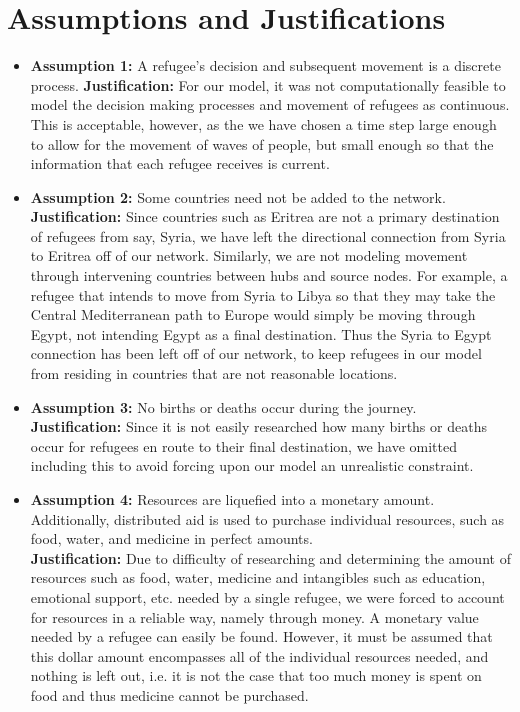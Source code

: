\documentclass{article}
\begin{document}
\section{Assumptions and Justifications}
\begin{itemize}

\item \textbf{Assumption 1:} A refugee's decision and subsequent movement is a discrete process.
\noindent \textbf{Justification:} For our model, it was not computationally feasible to model the decision making processes and movement of refugees as continuous. This is acceptable, however, as the we have chosen a time step large enough to allow for the movement of waves of people, but small enough so that the information that each refugee receives is current.

\item \textbf{Assumption 2:} Some countries need not be added to the network.\\
\noindent \textbf{Justification:} Since countries such as Eritrea are not a primary destination of refugees from say, Syria, we have left the directional connection from Syria to Eritrea off of our network. Similarly, we are not modeling movement through intervening countries between hubs and source nodes. For example, a refugee that intends to move from Syria to Libya so that they may take the Central Mediterranean path to Europe would simply be moving through Egypt, not intending Egypt as a final destination. Thus the Syria to Egypt connection has been left off of our network, to keep refugees in our model from residing in countries that are not reasonable locations.

\item \textbf{Assumption 3:} No births or deaths occur during the journey.\\
\noindent \textbf{Justification:} Since it is not easily researched how many births or deaths occur for refugees en route to their final destination, we have omitted including this to avoid forcing upon our model an unrealistic constraint. 

\item \textbf{Assumption 4:} Resources are liquefied into a monetary amount. Additionally, distributed aid is used to purchase individual resources, such as food, water, and medicine in perfect amounts.\\
\noindent \textbf{Justification:} Due to difficulty of researching and determining the amount of resources such as food, water, medicine and intangibles such as education, emotional support, etc. needed by a single refugee, we were forced to account for resources in a reliable way, namely through money. A monetary value needed by a refugee can easily be found. However, it must be assumed that this dollar amount encompasses all of the individual resources needed, and nothing is left out, i.e. it is not the case that too much money is spent on food and thus medicine cannot be purchased.


\end{itemize}
\end{document}
